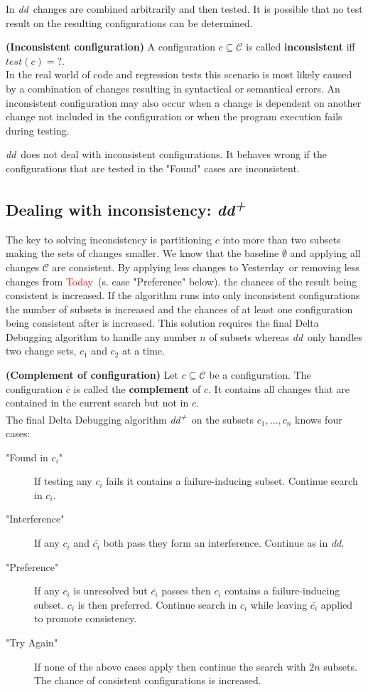 \documentclass[a4paper,UKenglish]{lipics-v2018}
\newcommand{\dd}[0]{\textit{dd}}
\newcommand{\ddp}{\textit{dd\textsuperscript{+}}}
\newcommand{\green}[1]{\textcolor{td-green}{#1}}
\newcommand{\red}[1]{\textcolor{red}{#1}}
\newcommand{\yd}[0]{\green{Yesterday}}
\newcommand{\td}[0]{\red{Today}}
\newcommand{\C}[0]{\ensuremath{\mathcal{C}}}
\newcommand{\qmark}{\textbf{?}}
\newcommand{\defsub}[1]{\textbf{(#1)} }
\begin{document}
In \dd\ changes are combined arbitrarily and then tested. It is possible that no test result on the resulting configurations can be determined. 

 \defsub{Inconsistent configuration} A configuration $c \subseteq \C$ is called \textbf{inconsistent} iff $test(c) = \qmark$. \\

In the real world of code and regression tests this scenario is most likely caused by a combination of changes resulting in syntactical or semantical errors. An inconsistent configuration may also occur when a change is dependent on another change not included in the configuration or when the program execution fails during testing. 

\dd\ does not deal with inconsistent configurations. It behaves wrong if the configurations that are tested in the "Found" cases are inconsistent.


\subsection{Dealing with inconsistency: \ddp}

The key to solving inconsistency is partitioning $c$ into more than two subsets making the sets of changes smaller. We know that the baseline $\emptyset$ and applying all changes $\C$ are consistent. By applying less changes to \yd\ or removing less changes from \td\ (s. case "Preference" below). the chances of the result being consistent is increased. If the algorithm runs into only inconsistent configurations the number of subsets is increased and the chances of at least one configuration being consistent after is increased. This solution requires the final Delta Debugging algorithm to handle any number $n$ of subsets whereas \dd\ only handles two change sets, $c_1$ and $c_2$ at a time.

 \defsub{Complement of configuration} Let $c \subseteq \C$ be a configuration. The configuration $\bar{c}$ is called the \textbf{complement} of $c$. It contains all changes that are contained in the current search but not in $c$.\\

The final Delta Debugging algorithm \ddp\ on the subsets $c_1, \dots, c_n$ knows four cases:\\
\begin{description}
	\item["Found in $c_i$"] If testing any $c_i$ fails it contains a failure-inducing subset. Continue search in $c_i$.
	\item["Interference"] If any $c_i$ and $\bar{c_i}$ both pass they form an interference. Continue as in \dd.
	\item["Preference"] If any $c_i$ is unresolved but $\bar{c_i}$ passes then $c_i$ contains a failure-inducing subset. $c_i$ is then preferred. Continue search in $c_i$ while leaving $\bar{c_i}$ applied to promote consistency.
	\item["Try Again"] If none of the above cases apply then continue the search with $2n$ subsets. The chance of consistent configurations is increased.
\end{description}
\end{document}
